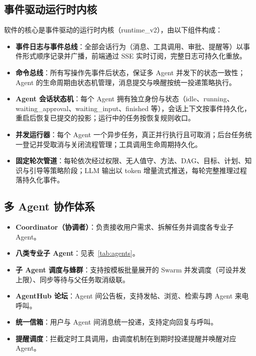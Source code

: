 \documentclass[zihao=-4,a4paper,fontset=none]{ctexart}
\begin{document}
\subsection{事件驱动运行时内核}
软件的核心是事件驱动的运行时内核（runtime\_v2），由以下组件构成：
\begin{itemize}[itemsep=2pt]
  \item \textbf{事件日志与事件总线}：全部会话行为（消息、工具调用、审批、提醒等）以事件形式顺序记录并广播，前端通过 SSE 实时订阅，完整日志可持久化重放。
  \item \textbf{命令总线}：所有写操作先事件后状态，保证多 Agent 并发下的状态一致性；Agent 的生命周期由状态机管理，消息提交与唤醒按统一投递策略执行。
  \item \textbf{Agent 会话状态机}：每个 Agent 拥有独立身份与状态（idle、running、waiting\_approval、waiting\_input、finished 等），会话上下文按事件持久化，重启后恢复已提交的投影；运行中的任务按恢复规则收口。
  \item \textbf{并发运行器}：每个 Agent 一个异步任务，真正并行执行且可取消；后台任务统一登记并受取消与关闭流程管理；工具调用生命周期持久化。
  \item \textbf{固定轮次管道}：每轮依次经过权限、无人值守、方法、DAG、目标、计划、知识与引导等策略阶段；LLM 输出以 token 增量流式推送，每轮完整推理过程落持久化事件。
\end{itemize}

\subsection{多 Agent 协作体系}
\begin{itemize}[itemsep=2pt]
  \item \textbf{Coordinator（协调者）}：负责接收用户需求、拆解任务并调度各专业子 Agent。
  \item \textbf{八类专业子 Agent}：见表~\ref{tab:agents}。
  \item \textbf{子 Agent 调度与蜂群}：支持按模板批量展开的 Swarm 并发调度（可设并发上限）、同步等待与父任务取消级联。
  \item \textbf{AgentHub 论坛}：Agent 间公告板，支持发帖、浏览、检索与跨 Agent 来电呼叫。
  \item \textbf{统一信箱}：用户与 Agent 间消息统一投递，支持定向回复与呼叫。
  \item \textbf{提醒调度}：拦截定时工具调用，由调度机制在到期时投递提醒并唤醒对应 Agent。
\end{itemize}
\end{document}
